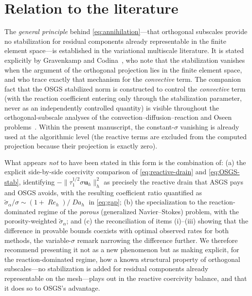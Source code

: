 \documentclass[11pt]{article}
\newcommand{\Reyn}{\operatorname{\mathit{Re}}}
\newcommand{\Damk}{\operatorname{\mathit{Da}}}
\theoremstyle{plain}
\theoremstyle{remark}
\newcommand{\uh}{\boldsymbol{u}_h}
\newcommand{\siga}{\widetilde{\sigma}_\alpha}
\begin{document}
\section{Relation to the literature}
The \emph{general principle} behind \cref{eq:annihilation}---that orthogonal
subscales provide no stabilization for residual components already representable in
the finite element space---is established in the variational multiscale
literature. It is stated explicitly by Gravenkamp and
Codina~\cite{gravenkamp2023dispersed}, who note that the stabilization vanishes
when the argument of the orthogonal projection lies in the finite element space,
and who trace exactly that mechanism for the \emph{convective} term. The
companion fact that the OSGS stabilized norm is constructed to control the
\emph{convective} term (with the reaction coefficient entering only through the
stabilization parameter, never as an independently controlled quantity) is visible
throughout the orthogonal-subscale analyses of the convection--diffusion--reaction
and Oseen problems~\cite{codina2002stabilized,codina-blasco2002cdr,codina2008analysis}.
Within the present manuscript, the constant-$\sigma$ vanishing is already used at
the algorithmic level (the reactive terms are excluded from the computed
projection because their projection is exactly zero).

What appears \emph{not} to have been stated in this form is the combination of:
(a) the explicit side-by-side coercivity comparison of \cref{eq:reactive-drain}
and \cref{eq:OSGS-stab}, identifying $-\|\tau_1^{1/2}\sigma\uh\|_h^2$ as precisely
the reactive drain that ASGS pays and OSGS avoids, with the resulting coefficient
ratio quantified as $\siga/\sigma\sim(1+\Reyn_h)/\Damk_h$ in \cref{eq:gap}; (b) the
specialization to the reaction-dominated regime of the \emph{porous} (generalized
Navier--Stokes) problem, with the porosity-weighted $\siga$; and (c) the
reconciliation of items (i)--(iii) showing that the difference in provable bounds
coexists with optimal observed rates for both methods, the variable-$\sigma$ remark
narrowing the difference further. We therefore recommend presenting it not as a new
phenomenon but as making explicit, for the reaction-dominated regime, how a known
structural property of orthogonal subscales---no stabilization is added for residual
components already representable on the mesh---plays out in the reactive coercivity
balance, and that it does so to OSGS's advantage.
\end{document}
